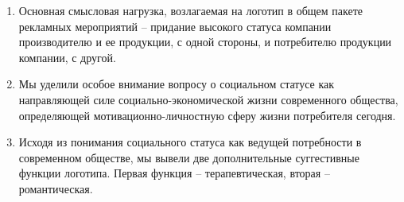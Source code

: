 \begin{enumerate}
\item Основная смысловая нагрузка, возлагаемая на логотип в общем пакете
  рекламных мероприятий -- придание высокого статуса компании производителю и
  ее продукции, с одной стороны, и потребителю продукции компании, с другой.
\item Мы уделили особое внимание вопросу о социальном статусе как
  направляющей силе социально-экономической жизни современного общества,
  определяющей мотивационно-личностную сферу жизни потребителя сегодня.
\item Исходя из понимания социального статуса как ведущей потребности в
  современном обществе, мы вывели две дополнительные суггестивные функции
  логотипа. Первая функция -- терапевтическая, вторая -- романтическая.
\end{enumerate}
